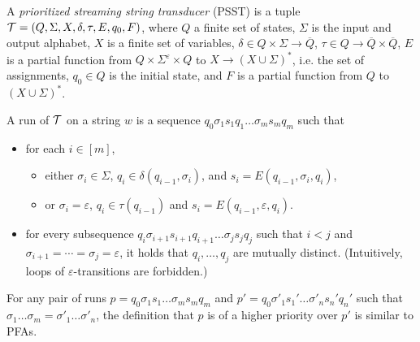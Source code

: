 \begin{definition}
A \emph{prioritized streaming string transducer} (PSST) is a tuple $\mathcal{T} = (Q, \Sigma, X, \delta, \tau, E, q_0, F)$, where $Q$ a
finite set of states, $\Sigma$ is the input and output alphabet, $X$ is a finite set of variables, $\delta \in Q \times \Sigma \rightarrow \overline{Q}$, $\tau \in Q \rightarrow \overline{Q} \times \overline{Q}$, $E$ is a partial function from $Q \times \Sigma^\varepsilon \times
  Q$ to $X \rightarrow (X \cup \Sigma)^{\ast}$, i.e. the set of assignments,
   $q_0 \in Q$ is the initial state, and $F$ is a partial function
  from $Q$ to $(X \cup \Sigma)^{\ast}$.

A run of $\mathcal{T}$ on a string $w$ is a sequence $q_0 \sigma_1 s_1 q_1 \ldots \sigma_m s_m q_m$ such that
\begin{itemize}
%
\item for each $i \in [m]$, 
\begin{itemize}
\item either $\sigma_i \in \Sigma$, $q_i \in \delta (q_{i-1}, \sigma_i)$, and $s_i = E (q_{i - 1}, \sigma_i, q_i)$, 
\item or $\sigma_i = \varepsilon$, $q_i \in \tau(q_{i-1})$ and $s_i = E (q_{i - 1}, \varepsilon, q_i)$.
\end{itemize}

\item for every subsequence $q_i \sigma_{i+1} s_{i+1} q_{i+1} \ldots \sigma_{j} s_j q_j$ such that  $i < j$ and $\sigma_{i+1} = \cdots = \sigma_j = \varepsilon$, it holds that $q_i, \ldots, q_j$ are mutually distinct. (Intuitively, loops of $\varepsilon$-transitions are forbidden.) 
\end{itemize}

For any pair of runs $p = q_0 \sigma_1 s_1 \ldots \sigma_m s_m q_m$ and $p' = q_0 \sigma'_1
  s_1' \ldots \sigma'_n s_n' q_n'$ such that $\sigma_1 \ldots \sigma_m = \sigma'_1 \ldots \sigma'_n$, the definition that $p$ is of a higher priority over
  $p'$ is similar to PFAs.
  

\end{definition}
